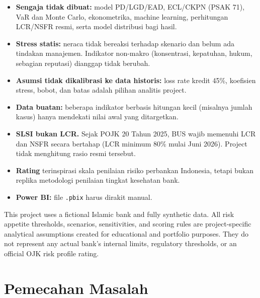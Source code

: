 \documentclass[11pt,a4paper]{article}
\newcommand{\file}[1]{\texttt{\small #1}}
\begin{document}
\begin{itemize}
\item \textbf{Sengaja tidak dibuat:} model PD/LGD/EAD, ECL/CKPN (PSAK 71), VaR dan Monte Carlo, ekonometrika, machine learning, perhitungan LCR/NSFR resmi, serta model distribusi bagi hasil.
\item \textbf{Stress statis:} neraca tidak bereaksi terhadap skenario dan belum ada tindakan manajemen. Indikator non-makro (konsentrasi, kepatuhan, hukum, sebagian reputasi) dianggap tidak berubah.
\item \textbf{Asumsi tidak dikalibrasi ke data historis:} loss rate kredit 45\%, koefisien stress, bobot, dan batas adalah pilihan analitis project.
\item \textbf{Data buatan:} beberapa indikator berbasis hitungan kecil (misalnya jumlah kasus) hanya mendekati nilai awal yang ditargetkan.
\item \textbf{SLSI bukan LCR.} Sejak POJK 20 Tahun 2025, BUS wajib memenuhi LCR dan NSFR secara bertahap (LCR minimum 80\% mulai Juni 2026). Project tidak menghitung rasio resmi tersebut.
\item \textbf{Rating} terinspirasi skala penilaian risiko perbankan Indonesia, tetapi bukan replika metodologi penilaian tingkat kesehatan bank.
\item \textbf{Power BI:} file \file{.pbix} harus dirakit manual.
\end{itemize}

\begin{tcolorbox}[colback=softgrey,colframe=navy,boxrule=0.6pt,arc=2pt,title=Disclaimer,fonttitle=\bfseries]
This project uses a fictional Islamic bank and fully synthetic data. All risk appetite thresholds, scenarios, sensitivities, and scoring rules are project-specific analytical assumptions created for educational and portfolio purposes. They do not represent any actual bank's internal limits, regulatory thresholds, or an official OJK risk profile rating.
\end{tcolorbox}
\section{Pemecahan Masalah}\label{sec:masalah}
\end{document}

